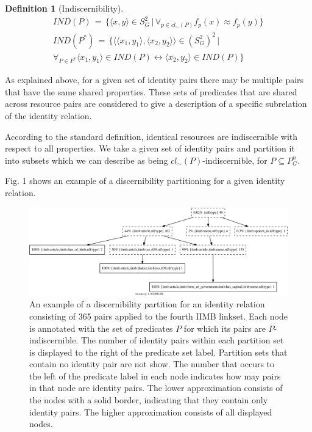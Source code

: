 \documentclass[letterpaper]{article}
\newtheorem{definition}{Definition}
\newcommand{\pair}[2]{\langle#1,#2\rangle}
\newcommand{\setdef}[2]{\{#1\,\vert\,#2\}}
\begin{document}
\small
\begin{definition}[Indiscernibility]
\begin{align}
\label{def:resource_indiscernability}
\mathit{IND}(P) \,=\,
  \setdef{
    \pair{x}{y} \in S_G^2
  }{
    \forall_{p \in cl_{\sim}(P)} f_p(x) \approx f_p(y)
  }
\\
\label{pair indiscernibility}
\mathit{IND}(P^*) \,=\,
  \setdef{
    \pair{\pair{x_1}{y_1}}{\pair{x_2}{y_2}} \in (S_G^2)^2
  }{\\
    \forall_{P \in P^*}
        \pair{x_1}{y_1} \in \mathit{IND}(P)
      \leftrightarrow 
        \pair{x_2}{y_2} \in \mathit{IND}(P)
  }\nonumber
\end{align}
\end{definition}
\normalsize

\noindent As explained above, for a given set of identity pairs there
  may be multiple pairs that have the same shared properties.
These sets of predicates that are shared across resource pairs are
  considered to give a description of a specific subrelation of
  the identity relation.

According to the standard definition,
  identical resources are indiscernible with respect to all properties.
We take a given set of identity pairs and partition it into subsets which
  we can describe as being $cl_{\sim}(P)$-indiscernible,
  for $P \subseteq P_G^n$.

Fig. 1 shows an example
  of a discernibility partitioning for a given identity relation.

\begin{figure}
\label{fig:iimb_example}
\centering
\includegraphics[width=\textwidth]{iimb_approximation_example_crop}
\caption{
  An example of a discernibility partition for an identity relation
    consisting of 365 pairs applied to the fourth IIMB linkset.
  Each node is annotated with the set of predicates $P$ for which
    its pairs are $P$-indiscernible.
  The number of identity pairs within each partition set
    is displayed to the right of the predicate set label.
  Partition sets that contain no identity pair are not show.
  The number that occurs to the left of the predicate label in each node
    indicates how may pairs in that node are identity pairs.
  The lower approximation consists of the nodes with a solid border,
    indicating that they contain only identity pairs.
  The higher approximation consists of all displayed nodes.}
\end{figure}
\end{document}
